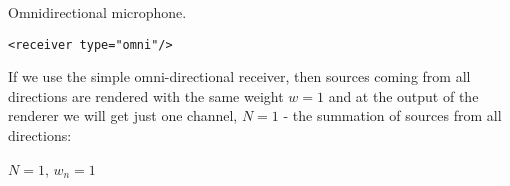 Omnidirectional microphone.

\begin{lstlisting}[numbers=none]
<receiver type="omni"/>
\end{lstlisting}

If we use the simple omni-directional receiver, then sources coming
from all directions are rendered with the same weight $w=1$ and at the
output of the renderer we will get just one channel, $N=1$ - the
summation of sources from all directions:

$N=1$,
$w_n=1$

